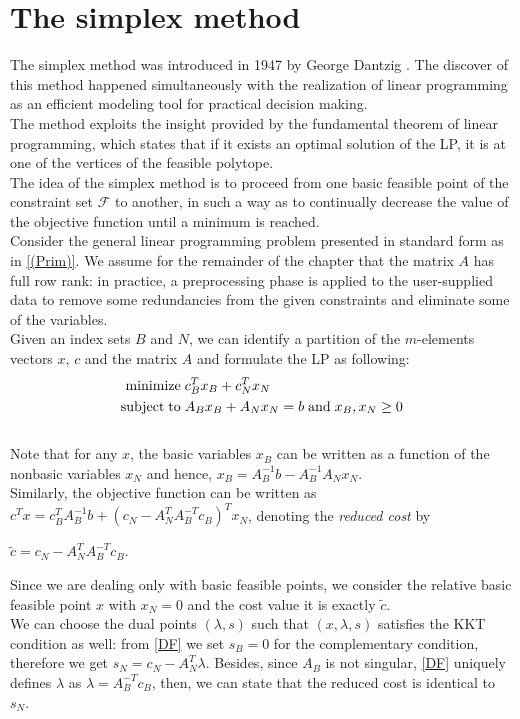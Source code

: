\documentclass[a4paper,10 pt,titlepage,twoside]{book}
\theoremstyle{plain}
\theoremstyle{definition}
\theoremstyle{remark}
\begin{document}
\chapter{The simplex method}
The simplex method was introduced in 1947 by George Dantzig \cite{MUR}. The discover of this method happened simultaneously with the realization of linear programming as an efficient modeling tool for practical decision making.\\
The method exploits the insight provided by the fundamental theorem
of linear programming, which states that if it exists an optimal solution of the LP, it is at one of the vertices of the feasible polytope. \\
The idea of the simplex method is to proceed from one basic feasible point of the constraint set $\mathcal{F}$ to another, in such a way as to continually decrease the value of the objective
function until a minimum is reached.\\ Consider the general linear programming problem presented in standard form as in \ref{(Prim)}.
We assume for the remainder of the chapter that the matrix $A$ has full row rank: in practice, a preprocessing phase is applied to the user-supplied data to remove some
redundancies from the given constraints and eliminate some of the variables.\\Given an index sets $B$ and $N$, we can identify a partition of the $m$-elements vectors $x$, $c$ and the matrix $A$ and formulate the LP as following:
\begin{equation}
\begin{split}
\text{minimize\;} &c^{T}_{B}x_{B}+c^{T}_{N}x_{N}\\
\text{subject\;to\;}&A_{B}x_{B}+A_{N}x_{N} = b\text{\;and\;}x_{B}, x_{N}\geq0
\end{split}
\end{equation}
 \\Note that for any $x$, the basic variables $x_{B}$ can be written as a function of the nonbasic variables $x_{N}$ and hence, $x_{B}=A_{B}^{-1}b-A_{B}^{-1}A_{N}x_{N}$. \\Similarly, the objective function can be written as $c^{T}x=c_{B}^{T}A_{B}^{-1}b+(c_{N}-A_{N}^{T}A_{B}^{-T}c_{B})^{T}x_{N}$, denoting the \textit{reduced cost} by \begin{center}
 	$\widetilde{c}=c_{N}-A_{N}^{T}A_{B}^{-T}c_{B}$.
 \end{center}Since we are dealing only with basic feasible points, we consider the relative basic feasible point $x$ with $x_{N}= 0$ and the cost value it is exactly $\widetilde{c}$.\\
 We can choose the dual points $(\lambda,s)$ such that $(x, \lambda, s)$ satisfies the KKT condition as well: from \ref{DF} we set $s_{B}= 0$ for the complementary condition, therefore we get $s_{N}= c_{N}- A_{N}^{T}\lambda$. Besides, since $A_{B}$ is not singular, \ref{DF} uniquely defines $\lambda$ as $\lambda = A_{B}^{-T}c_{B}$, then, we can state that the reduced cost is identical to $s_{N}$.\\  
 
\end{document}
